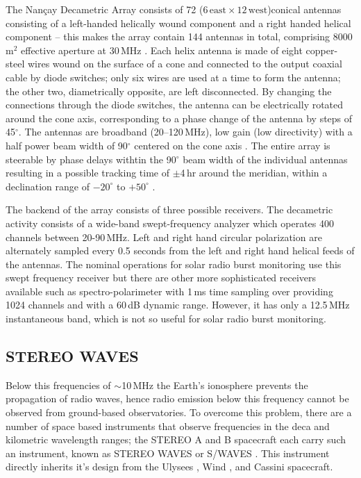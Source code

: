 The Nan\c{c}ay Decametric Array consists of 72 ($6\,\mathrm{east} \times12\,\mathrm{west}$)conical antennas consisting of a left-handed helically wound component and a right handed helical component -- this makes the array contain 144 antennas in total, comprising 8000\,m$^2$ effective aperture at 30\,MHz \citep{lecacheux2000}. Each helix antenna is made of eight copper-steel wires wound on the surface of a cone and connected to the output coaxial cable by diode switches; only six wires are used at a time to form the antenna; the other two, diametrically opposite, are left disconnected. By changing the connections through the diode switches, the antenna can be electrically rotated around the cone axis, corresponding to a phase change of the antenna by steps of 45$^{\circ}$. The antennas are broadband (20--120\,MHz), low gain (low directivity) with a half power beam width of 90$^{\circ}$ centered on the cone axis \citep{boischot1980}. The entire array is steerable by phase delays withtin the 90$^{\circ}$  beam width of the individual antennas resulting in a possible tracking time of $\pm$4\,hr around the meridian, within a declination range of $-20^{\circ}$ to $+50^{\circ}$ .

The backend of the array consists of three possible receivers. The decametric activity consists of a wide-band swept-frequency analyzer which operates 400 channels between 20-90\,MHz. Left and right hand circular polarization are alternately sampled every 0.5 seconds from the left and right hand helical feeds of the antennas. The nominal operations for solar radio burst monitoring use this swept frequency receiver but there are other more sophisticated receivers available such as spectro-polarimeter with 1\,ms time sampling over providing 1024 channels and with a 60\,dB dynamic range. However, it has only a 12.5\,MHz instantaneous band, which is not so useful for solar radio burst monitoring.

\subsection{STEREO WAVES}\label{sec:31}

Below this frequencies of $\sim$10\,MHz the Earth's ionosphere prevents the propagation of radio waves, hence radio emission below this frequency cannot be observed from ground-based observatories. To overcome this problem, there are a number of space based instruments that observe frequencies in the deca and kilometric wavelength ranges; the STEREO A and B spacecraft each carry such an instrument, known as STEREO WAVES or S/WAVES \citep{bougeret2008}. This instrument directly inherits it's design from the Ulysees \citep{stone1992}, Wind \citep{bougeret1995}, and Cassini \citep{gurnett2004} spacecraft.

